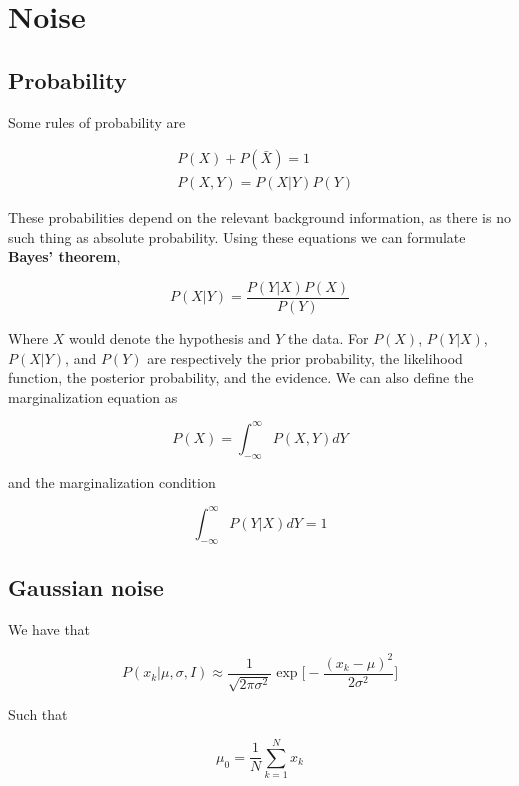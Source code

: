 \documentclass[a4paper]{article}
\begin{document}
\section{Noise}

\subsection{Probability}

Some rules of probability are

\begin{align*}
    &P(X)+P(\bar{X})=1\\
    &P(X,Y)=P(X|Y)P(Y)
\end{align*}

These probabilities depend on the relevant background information, as there is no such thing as absolute probability. Using these equations we can formulate \textbf{Bayes' theorem},

\begin{equation*}
    P(X|Y)=\frac{P(Y|X)P(X)}{P(Y)}
\end{equation*}

Where $X$ would denote the hypothesis and $Y$ the data. For $P(X)$, $P(Y|X)$, $P(X|Y)$, and $P(Y)$ are respectively the prior probability, the likelihood function, the posterior probability, and the evidence. We can also define the marginalization equation as

\begin{equation*}
    P(X)=\int_{-\infty}^{\infty}P(X,Y)dY
\end{equation*}

and the marginalization condition

\begin{equation*}
    \int_{-\infty}^{\infty}P(Y|X)dY=1
\end{equation*}

\subsection{Gaussian noise}

We have that

\begin{equation*}
    P(x_k|\mu, \sigma, I)\approx\frac{1}{\sqrt{2\pi\sigma^2}}\exp{\bigg[-\frac{(x_k-\mu)^2}{2\sigma^2}\bigg]}
\end{equation*}

Such that

\begin{equation*}
    \mu_0=\frac{1}{N}\sum_{k=1}^{N}x_k
\end{equation*}
\end{document}
